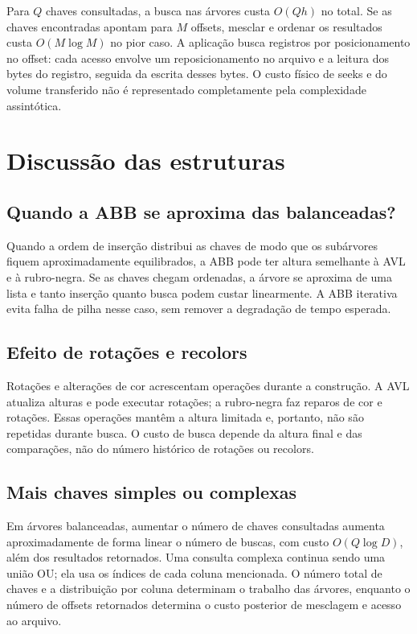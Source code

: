 \documentclass[12pt,a4paper]{article}
\begin{document}
Para $Q$ chaves consultadas, a busca nas árvores custa $O(Qh)$ no total. Se as chaves encontradas apontam para $M$ offsets, mesclar e ordenar os resultados custa $O(M\log M)$ no pior caso. A aplicação busca registros por posicionamento no offset: cada acesso envolve um reposicionamento no arquivo e a leitura dos bytes do registro, seguida da escrita desses bytes. O custo físico de seeks e do volume transferido não é representado completamente pela complexidade assintótica.

\section{Discussão das estruturas}
\subsection{Quando a ABB se aproxima das balanceadas?}
Quando a ordem de inserção distribui as chaves de modo que os subárvores fiquem aproximadamente equilibrados, a ABB pode ter altura semelhante à AVL e à rubro-negra. Se as chaves chegam ordenadas, a árvore se aproxima de uma lista e tanto inserção quanto busca podem custar linearmente. A ABB iterativa evita falha de pilha nesse caso, sem remover a degradação de tempo esperada.

\subsection{Efeito de rotações e recolors}
Rotações e alterações de cor acrescentam operações durante a construção. A AVL atualiza alturas e pode executar rotações; a rubro-negra faz reparos de cor e rotações. Essas operações mantêm a altura limitada e, portanto, não são repetidas durante busca. O custo de busca depende da altura final e das comparações, não do número histórico de rotações ou recolors.

\subsection{Mais chaves simples ou complexas}
Em árvores balanceadas, aumentar o número de chaves consultadas aumenta aproximadamente de forma linear o número de buscas, com custo $O(Q\log D)$, além dos resultados retornados. Uma consulta complexa continua sendo uma união OU; ela usa os índices de cada coluna mencionada. O número total de chaves e a distribuição por coluna determinam o trabalho das árvores, enquanto o número de offsets retornados determina o custo posterior de mesclagem e acesso ao arquivo.
\end{document}
